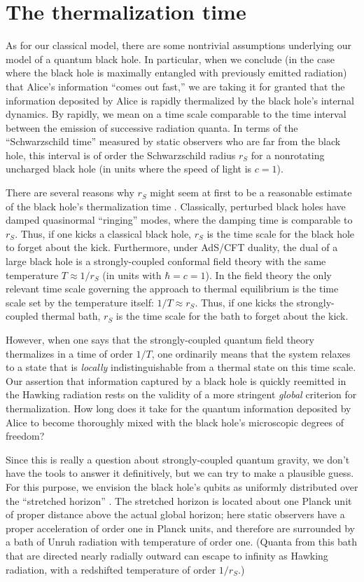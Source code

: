 \documentclass[11pt]{article}
\begin{document}
\section{The thermalization time}
\label{sec:thermalization}
As for our classical model, there are some nontrivial assumptions underlying our model of a quantum black hole. In particular, when we conclude (in the case where the black hole is maximally entangled with previously emitted radiation) that Alice's information ``comes out fast,'' we are taking it for granted that the information deposited by Alice is rapidly thermalized by the black hole's internal dynamics. By rapidly, we mean on a time scale comparable to the time interval between the emission of successive radiation quanta. In terms of the ``Schwarzschild time'' measured by static observers who are far from the black hole, this interval is of order the Schwarzschild radius $r_S$ for a nonrotating uncharged black hole (in units where the speed of light is $c=1$).

There are several reasons why $r_S$ might seem at first to be a reasonable estimate of the black hole's thermalization time \cite{horowitz}. Classically, perturbed black holes have damped quasinormal ``ringing'' modes, where the damping time is comparable to $r_S$. Thus, if one kicks a classical black hole, $r_S$ is the time scale for the black hole to forget about the kick. Furthermore, under AdS/CFT duality, the dual of a large black hole is a strongly-coupled conformal field theory with the same temperature $T\approx 1/r_S$ (in units with $\hbar=c=1$). In the field theory the only relevant time scale governing the approach to thermal equilibrium is the time scale set by the temperature itself: $1/T\approx r_S$. Thus, if one kicks the strongly-coupled thermal bath, $r_S$ is the time scale for the bath to forget about the kick.

However, when one says that the strongly-coupled quantum field theory thermalizes in a time of order $1/T$, one ordinarily means that the system relaxes to a state that is {\em locally} indistinguishable from a thermal state on this time scale. Our assertion that information captured by a black hole is quickly reemitted in the Hawking radiation rests on the validity of a more stringent {\em global} criterion for thermalization. How long does it take for the quantum information deposited by Alice to become thoroughly mixed with the black hole's microscopic degrees of freedom?

Since this is really a question about strongly-coupled quantum gravity, we don't have the tools to answer it definitively, but we can try to make a plausible guess. For this purpose, we envision the black hole's qubits as uniformly distributed over the ``stretched horizon'' \cite{complement,susskind-book}. The stretched horizon is located about one Planck unit of proper distance above the actual global horizon; here static observers have a proper acceleration of order one in Planck units, and therefore are surrounded by a bath of Unruh radiation with temperature of order one. (Quanta from this bath that are directed nearly radially outward can escape to infinity as Hawking radiation, with a redshifted temperature of order $1/r_S$.) 
\end{document}
